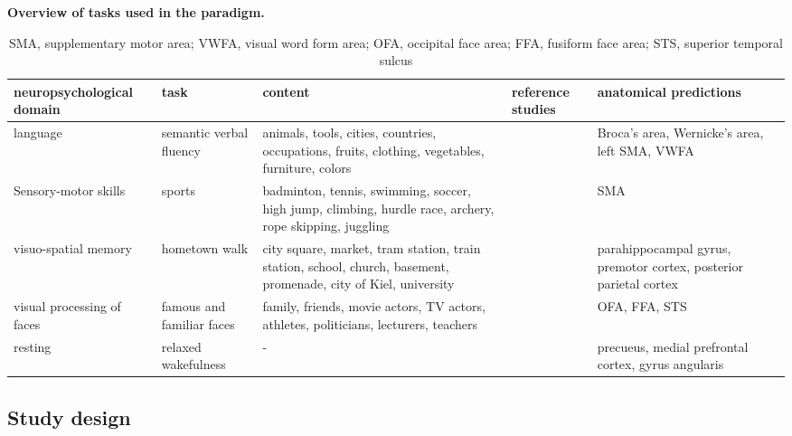 \documentclass[fleqn,10pt]{SelfArx} %
\begin{document}
\begin{table}[ht]
			\scriptsize
			\centering
			\captionsetup{singlelinecheck = false, justification=justified}

	\caption{\bf Overview of tasks used in the paradigm.}
	\begin{tabularx}{\textwidth}{XXXXX}
		
		\hline
		{\bf neuropsychological domain} &	{\bf 	task} &	{\bf 	content} &	{\bf 	reference studies} &	{\bf 	anatomical predictions} \\
		\hline
		
		language &
		semantic verbal fluency &
		animals, tools, cities, countries, occupations, fruits, clothing, vegetables, furniture, colors &
		\citet{Woermann_2003} &
		Broca's area, Wernicke's area, left SMA, VWFA \\
		
		Sensory-motor skills &
		sports &
		badminton, tennis, swimming, soccer, high jump, climbing, hurdle race, archery, rope skipping, juggling &
		\citet{Owen_2006} & 
		SMA \\
		
		visuo-spatial memory &
		hometown walk &
		city square, market, tram station, train station, school, church, basement, promenade, city of Kiel, university &
		\citet{Jokeit_2001, Owen_2006} &
		parahippocampal gyrus, premotor cortex, posterior parietal cortex \\
		
		visual processing of faces &
		famous and familiar faces &
		family, friends, movie actors, TV actors, athletes, politicians, lecturers, teachers &
		\citet{O_Craven_2000, Haxby_2000}	 &
		OFA, FFA, STS \\
		
		resting &
		relaxed wakefulness & 
		- &
		\citet{Fox_2010}
		 &
		precueus, medial prefrontal cortex, gyrus angularis \\
		
		\hline
	\end{tabularx}
	\caption*{SMA, supplementary motor area; VWFA, visual word form area; OFA, occipital face area; FFA, fusiform face area; STS, superior temporal sulcus}
	\label{tab:taskTab}
\end{table}

\subsection{Study design}
\end{document}
